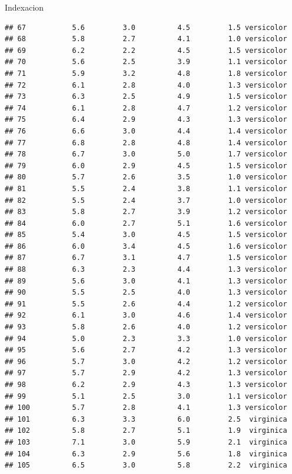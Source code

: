 \documentclass[
  ignorenonframetext,
]{beamer}
\begin{document}
\begin{frame}[fragile]{Indexacion}
\begin{verbatim}
## 67           5.6         3.0          4.5         1.5 versicolor
## 68           5.8         2.7          4.1         1.0 versicolor
## 69           6.2         2.2          4.5         1.5 versicolor
## 70           5.6         2.5          3.9         1.1 versicolor
## 71           5.9         3.2          4.8         1.8 versicolor
## 72           6.1         2.8          4.0         1.3 versicolor
## 73           6.3         2.5          4.9         1.5 versicolor
## 74           6.1         2.8          4.7         1.2 versicolor
## 75           6.4         2.9          4.3         1.3 versicolor
## 76           6.6         3.0          4.4         1.4 versicolor
## 77           6.8         2.8          4.8         1.4 versicolor
## 78           6.7         3.0          5.0         1.7 versicolor
## 79           6.0         2.9          4.5         1.5 versicolor
## 80           5.7         2.6          3.5         1.0 versicolor
## 81           5.5         2.4          3.8         1.1 versicolor
## 82           5.5         2.4          3.7         1.0 versicolor
## 83           5.8         2.7          3.9         1.2 versicolor
## 84           6.0         2.7          5.1         1.6 versicolor
## 85           5.4         3.0          4.5         1.5 versicolor
## 86           6.0         3.4          4.5         1.6 versicolor
## 87           6.7         3.1          4.7         1.5 versicolor
## 88           6.3         2.3          4.4         1.3 versicolor
## 89           5.6         3.0          4.1         1.3 versicolor
## 90           5.5         2.5          4.0         1.3 versicolor
## 91           5.5         2.6          4.4         1.2 versicolor
## 92           6.1         3.0          4.6         1.4 versicolor
## 93           5.8         2.6          4.0         1.2 versicolor
## 94           5.0         2.3          3.3         1.0 versicolor
## 95           5.6         2.7          4.2         1.3 versicolor
## 96           5.7         3.0          4.2         1.2 versicolor
## 97           5.7         2.9          4.2         1.3 versicolor
## 98           6.2         2.9          4.3         1.3 versicolor
## 99           5.1         2.5          3.0         1.1 versicolor
## 100          5.7         2.8          4.1         1.3 versicolor
## 101          6.3         3.3          6.0         2.5  virginica
## 102          5.8         2.7          5.1         1.9  virginica
## 103          7.1         3.0          5.9         2.1  virginica
## 104          6.3         2.9          5.6         1.8  virginica
## 105          6.5         3.0          5.8         2.2  virginica

\end{verbatim}
\end{frame}
\end{document}

